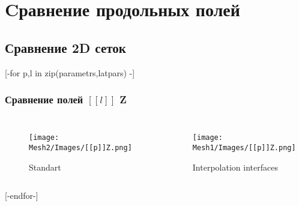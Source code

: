 \documentclass[c, aspectratio = 169]{beamer}
\begin{document}
    
        \section{Cравнение продольных полей} 
        \subsection{Сравнение 2D сеток}
        [-for p,l in zip(parametrs,latpars) -]
        \begin{frame}
        \frametitle{Сравнение полей $[[l]]$ Z }
        \vspace{-0.5cm}
        \begin{columns}[c] %
            \begin{figure}
                \texttt{[image: Mesh2/Images/[[p]]Z.png]}
                \vspace{-0.25cm}
                \caption{Standart}   
            \end{figure}  
            
            \vspace{-1.0cm} 
            
            \begin{figure}
                \texttt{[image: Mesh1/Images/[[p]]Z.png]}
                \vspace{-0.25cm}
                \caption{Interpolation interfaces}     
            \end{figure}   
            
        \end{columns}
        \end{frame}
        [-endfor-] 
    
\end{document}
